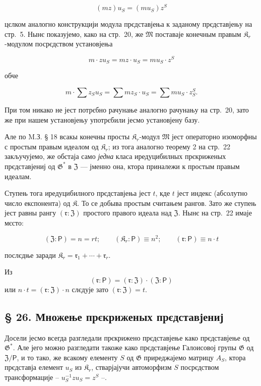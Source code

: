 \documentclass[11pt]{article}
\begin{document}
\[(mz) u_S = (mu_S) z^S\]

цєлком аналогно конструкцији модула прєдставјења к заданому прєдставјењу на стр.~5. Нынє показујемо, како на стр.~20, же \(\mathfrak{M}\) поставаје конечным правым \(\mathfrak K_r\)-модулом посрєдством установјења

\[m \cdot z u_S = mz \cdot u_S = mu_S \cdot z^S\]

обче

\[m \cdot \sum z_S u_S = \sum m z_S \cdot u_S = \sum m u_S \cdot z_S^S.\]

При том никако не јест потрєбно рачунање аналогно рачунању на стр.~20, зато же при нашем установјењу употрєбили јесмо установјену базу.

Але по M.З. § 18 всакы конечны просты \(\mathfrak K_r\)-модул \(\mathfrak{M}\) јест операторно изоморфны с простым правым идеалом од \(\mathfrak K_r\); из тога аналогно теорему 2 на стр.~22 закључујемо, же обстаја само \emph{једна} класа иредуцибилных прєкриженых прєдставјениј од \(\mathfrak{G}^*\) в \(\mathfrak Z\) --- јменно она, ктора приналежи к простым правым идеалам.

Ступењ тога иредуцибилного прєдставјења јест \(t\), кде \(t\) јест индекс (абсолутно число експонента) од \(\mathfrak K\). То се добыва простым считањем рангов. Зато же ступењ јест равны рангу \((\mathfrak r:\mathfrak Z)\) простого правого идеала над \(\mathfrak Z\). Нынє на стр.~22 имаје мєсто:

\[
(\mathfrak Z:\mathsf{P})=n=rt;\qquad (\mathfrak K_r:\mathsf{P})\equiv n^2;\qquad (\mathfrak r:\mathsf{P})\equiv n\cdot t
\]

послєдње заради \(\mathfrak K_r = \mathfrak{r}_1 + \cdots + \mathfrak{r}_r\).

Из
\[(\mathfrak{r}: \mathsf{P}) = (\mathfrak{r}: \mathfrak Z) \cdot (\mathfrak Z: \mathsf{P})\]
или \(n \cdot t = (\mathfrak{r}: \mathfrak Z) \cdot n\) слєдује зато \((\mathfrak{r}: \mathfrak Z) = t\).

\subsection*{§ 26. Множење прєкриженых прєдставјениј}\label{multiplikation-der-verschraenkten-darstellungen}

Досели јесмо всегда разгледали прєкрижено прєдставјење како прєдставјење од \(\mathfrak{G}^*\). Але јего можно разгледати такоже како прєдставјење Галоисовој групы \(\mathfrak{G}\) од \(\mathfrak Z/\mathsf{P}\), и то тако, же всакому елементу \(S\) од \(\mathfrak{G}\) приреджајемо матрицу \(A_S\), ктора прєдставја елемент \(u_S\) из \(\mathfrak K_r\), стварјајучи автоморфизм \(S\) посрєдством трансформације -- \(u_S^{-1}zu_S=z^S\) --.
\end{document}
